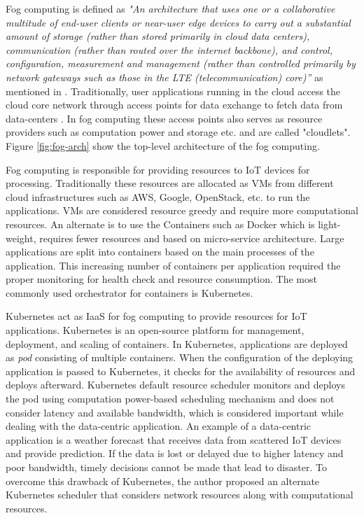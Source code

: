 Fog computing is defined as \emph{"An architecture that uses one or a collaborative multitude of end-user clients or near-user edge devices to carry out a substantial amount of storage (rather than stored primarily in cloud data centers), communication (rather than routed over the internet backbone), and control, configuration, measurement and management (rather than controlled primarily by network gateways such as those in the LTE (telecommunication) core)”} as mentioned in \cite{10.1145/3057266}. Traditionally, user applications running in the cloud access the cloud core network through access points for data exchange to fetch data from data-centers \cite{Bittencourt2017}. In fog computing these access points also serves as resource providers such as computation power and storage etc. and are called "cloudlets"\cite{Bittencourt2017}. Figure \ref{fig:fog-arch} show the top-level architecture of the fog computing. \par
Fog computing is responsible for providing resources to IoT devices for processing\cite{Santos2019}. Traditionally these resources are allocated as VMs from different cloud infrastructures such as AWS, Google, OpenStack, etc. to run the applications. VMs are considered resource greedy and require more computational resources. An alternate is to use the Containers such as Docker which is light-weight, requires fewer resources and based on micro-service architecture. Large applications are split into containers based on the main processes of the application. This increasing number of containers per application required the proper monitoring for health check and resource consumption\cite{k8s}. The most commonly used orchestrator for containers is Kubernetes. \par
Kubernetes act as IaaS for fog computing to provide resources for IoT applications. Kubernetes is an open-source platform for management, deployment, and scaling of containers\cite{k8s}. In Kubernetes, applications are deployed as \emph{pod} consisting of multiple containers. When the configuration of the deploying application is passed to Kubernetes, it checks for the availability of resources and deploys afterward\cite{k8s}. Kubernetes default resource scheduler monitors and deploys the pod using computation power-based scheduling mechanism and does not consider latency and available bandwidth, which is considered important while dealing with the data-centric application\cite{Santos2019}. An example of a data-centric application is a weather forecast that receives data from scattered IoT devices and provide prediction. If the data is lost or delayed due to higher latency and poor bandwidth, timely decisions cannot be made that lead to disaster. To overcome this drawback of Kubernetes, the author proposed an alternate Kubernetes scheduler that considers network resources along with computational resources\cite{Santos2019}.
